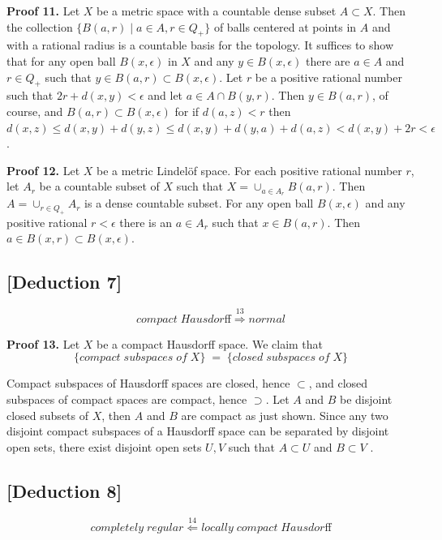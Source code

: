 \documentclass[11pt]{diazessay} %
\begin{document}
\vskip 10pt
\textbf{Proof 11.} Let $X$ be a metric space with a countable dense subset $A \subset X$. Then the collection $\{B(a, r) \;|\; a \in A, r \in Q_+\}$ of balls centered at
points in $A$ and with a rational radius is a countable basis for the topology. It suffices to show that for any open ball $B(x, \epsilon)$ in $X$ and any $y \in B(x, \epsilon)$ there are $a \in A$ and $r \in Q_+$
such that $y \in B(a, r) \subset B(x, \epsilon)$. Let $r$ be a positive rational number such that $2r + d(x, y) < \epsilon$
and let $a \in A \cap B(y, r)$. Then $y \in B(a, r)$, of course, and $B(a, r) \subset B(x, \epsilon)$ for if $d(a, z) < r$ then
$d(x, z) \leq d(x, y) + d(y, z) \leq d(x, y) + d(y, a) + d(a, z) < d(x, y) + 2r < \epsilon$.

\vskip 10pt
\textbf{Proof 12.} Let $X$ be a metric Lindelöf space. For each positive rational
number $r$, let $A_r$ be a countable subset of $X$ such that $X = \cup_{a\in A_r} B(a, r)$. Then $A = \cup_{r\in Q_+} A_r$ is a dense countable subset.
For any open ball $B(x, \epsilon)$ and any positive rational $r < \epsilon$ there is an
$a \in A_r$ such that $x \in B(a, r)$. Then $a \in B(x, r) \subset B(x, \epsilon)$.

\vskip 10pt
\subsection*{[Deduction 7]}
\vskip -10pt
\begin{equation}
	compact \; Hausdorﬀ \overset{13}{\Longrightarrow} normal 
\end{equation}

\vskip 10pt
\textbf{Proof 13.} Let $X$ be a compact Hausdorﬀ space. We claim that
$$\{compact \; subspaces \; of \; X\} \;=\; \{closed \; subspaces \; of \; X\}$$

Compact subspaces of Hausdorff spaces are closed, hence $\subset$, and closed subspaces of compact spaces are compact, hence $\supset$.
Let $A$ and $B$ be disjoint closed subsets of $X$, then $A$ and $B$ are compact as just shown.
Since any two disjoint compact subspaces of a Hausdorff space can be separated by disjoint open sets, there exist disjoint open sets $U , V$ such that $A \subset U$ and $B \subset V$ .

\vskip 10pt
\subsection*{[Deduction 8]}
\vskip -10pt
\begin{equation}
	completely \; regular \overset{14}{\Longleftarrow} locally \; compact \; Hausdorﬀ
\end{equation}
\end{document}
